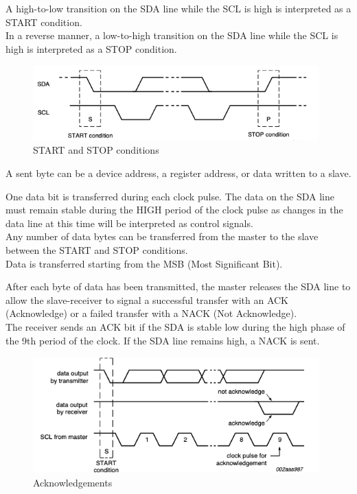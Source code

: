 \documentclass[a4paper, 12pt]{article}
\begin{document}
A high-to-low transition on the SDA line while the SCL is high is interpreted as a START condition. \\
In a reverse manner, a low-to-high transition on the SDA line while the SCL is high is interpreted as a STOP condition.

\begin{figure}[h]
    \includegraphics[width=11cm]{start_stop_conds}
    \centering
    \caption{START and STOP conditions}
\end{figure}

A sent byte can be a device address, a register address, or data written to a slave.

One data bit is transferred during each clock pulse. The data on the SDA line must remain stable during the HIGH period of the clock pulse as changes in the data line at this time will be interpreted as control signals. \\
Any number of data bytes can be transferred from the master to the slave between the START and STOP conditions. \\
Data is transferred starting from the MSB (Most Significant Bit).

After each byte of data has been transmitted, the master releases the SDA line to allow the slave-receiver to signal a successful transfer with an ACK (Acknowledge) or a failed transfer with a NACK (Not Acknowledge). \\
The receiver sends an ACK bit if the SDA is stable low during the high phase of the 9th period  of the clock. If the SDA line remains high, a NACK is sent.

\begin{figure}[h]
    \includegraphics[width=11cm]{ACK_NACK}
    \centering
    \caption{Acknowledgements}
\end{figure}
\end{document}
